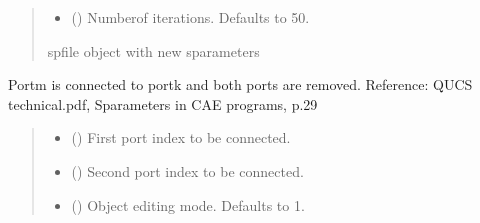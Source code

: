 \documentclass[letterpaper,10pt,english]{sphinxmanual}
\begin{document}
\begin{fulllineitems}
\begin{fulllineitems}
\begin{quote}
\begin{description}
\begin{itemize}
\item {} 
\sphinxAtStartPar
{} (\sphinxstyleliteralemphasis{\sphinxupquote{, }}) \textendash{} Numberof iterations. Defaults to 50.

\end{itemize}

\sphinxAtStartPar
spfile object with new s\sphinxhyphen{}parameters

\end{description}\end{quote}

\end{fulllineitems}


\begin{fulllineitems}
\label{\detokenize{touchstone:touchstone.spfile.connect_2_ports}}
\pysigstartsignatures
{}
\pysigstopsignatures
\sphinxAtStartPar
Port\sphinxhyphen{}m is connected to port\sphinxhyphen{}k and both ports are removed.
Reference: QUCS technical.pdf, S\sphinxhyphen{}parameters in CAE programs, p.29
\begin{quote}\begin{description}
\begin{itemize}
\item {} 
\sphinxAtStartPar
{} () \textendash{} First port index to be connected.

\item {} 
\sphinxAtStartPar
{} () \textendash{} Second port index to be connected.

\item {} 
\sphinxAtStartPar
{} (\sphinxstyleliteralemphasis{\sphinxupquote{, }}) \textendash{} Object editing mode. Defaults to \sphinxhyphen{}1.


\end{itemize}
\end{description}
\end{quote}
\end{fulllineitems}
\end{fulllineitems}
\end{document}

